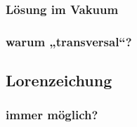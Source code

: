 \fehlt

\subsubsection{Lösung im Vakuum}

\subsubsection{warum „transversal“?}

\fehlt

\subsection{Lorenzeichung}

\fehlt

\subsubsection{immer möglich?}

\fehlt

%
%



